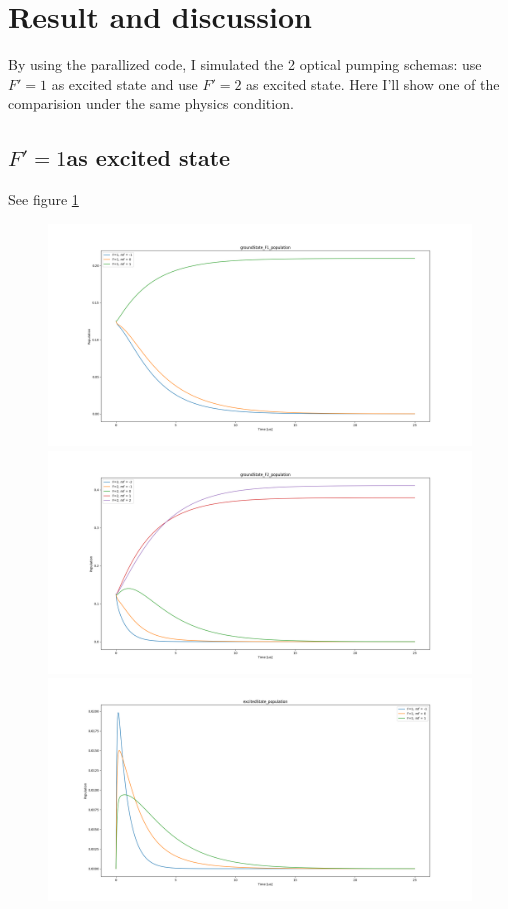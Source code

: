 \documentclass[a4paper, 10pt]{article}
\begin{document}
\section{Result and discussion}
By using the parallized code, I simulated the 2 optical pumping schemas: use $F\prime = 1$ as excited state and use $F\prime = 2$ as excited state. Here I'll show one of the comparision under the same physics condition.

\subsection{$F\prime = 1$as excited state}
See figure \ref{fig7}\\
\begin{figure}[h]
  \centering
  \caption{}
  \includegraphics[width = 1.15\textwidth]{f1fig1}
  \includegraphics[width = 1.15\textwidth]{f1fig2}
  \includegraphics[width = 1.15\textwidth]{f1fig3}
  \label{fig7}
\end{figure}
\end{document}
